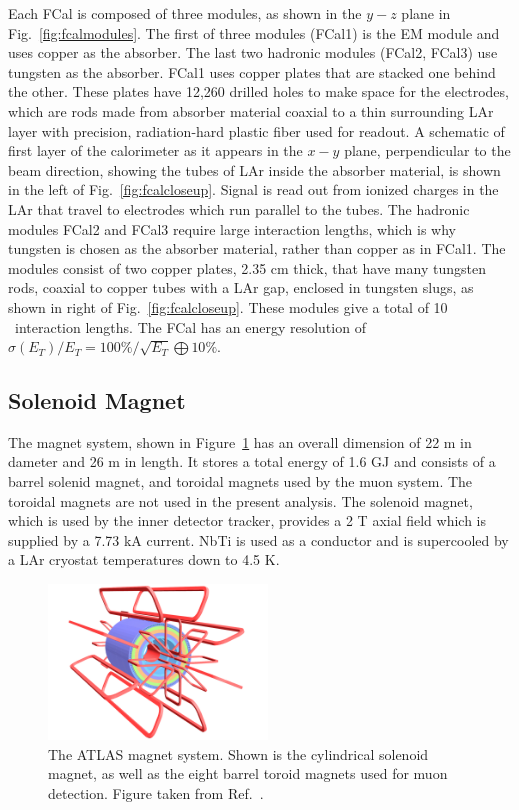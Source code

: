 Each FCal is composed of three modules, as shown in the $y-z$ plane in Fig.~\ref{fig:fcalmodules}. The first of three modules (FCal1) is the EM module and uses copper as the absorber. The last two hadronic modules (FCal2, FCal3) use tungsten as the absorber. FCal1 uses copper plates that are stacked one behind the other. These plates have 12,260 drilled holes to make space for the electrodes, which are rods made from absorber material coaxial to a thin surrounding LAr layer with precision, radiation-hard plastic fiber used for readout.  A schematic of first layer of the calorimeter as it appears in the $x-y$ plane, perpendicular to the beam direction, showing the tubes of LAr inside the absorber material, is shown in the left of Fig.~\ref{fig:fcalcloseup}. Signal is read out from ionized charges in the LAr that travel to electrodes which run parallel to the tubes. The hadronic modules FCal2 and FCal3 require large interaction lengths, which is why tungsten is chosen as the absorber material, rather than copper as in FCal1. The modules consist of two copper plates, 2.35 cm thick, that have many tungsten rods, coaxial to copper tubes with a LAr gap, enclosed in tungsten slugs, as shown in right of Fig.~\ref{fig:fcalcloseup}. These modules give a total of 10 \intlen\ interaction lengths. The FCal has an energy resolution of $\sigma(E_{T})/E_{T}=100\%/\sqrt{E_{T}}\bigoplus10\%$. 

\subsection{Solenoid Magnet}
The magnet system, shown in Figure~\ref{fig:magnet} has an overall dimension of 22 m in dameter and 26 m in length. It stores a total energy of 1.6 GJ and consists of a barrel solenid magnet, and toroidal magnets used by the muon system. The toroidal magnets are not used in the present analysis. The solenoid magnet, which is used by the inner detector tracker, provides a 2 T axial field which is supplied by a 7.73 kA current. NbTi is used as a conductor and is supercooled by a LAr cryostat temperatures down to 4.5 K. 


\begin{figure}
	\centerline{
		\includegraphics[width=0.52\textwidth]{figures/magnet.pdf} %
	}
	\caption{ The ATLAS magnet system. Shown is the cylindrical solenoid magnet, as well as the eight barrel toroid magnets used for muon detection. Figure taken from Ref.~\cite{Aad:2008zzm}.}	
	\label{fig:magnet}
\end{figure}

